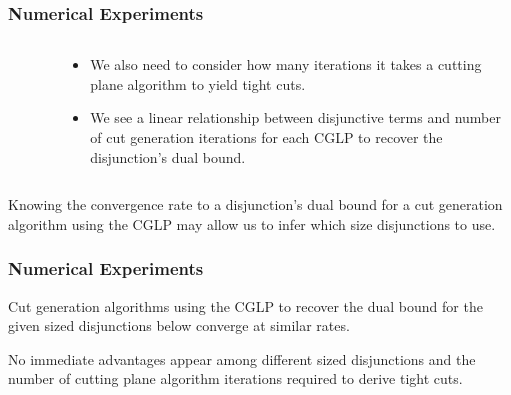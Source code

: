\documentclass{beamer}
\begin{document}
	
	\begin{frame}[t]
		\frametitle{Numerical Experiments}
		\small
		\begin{columns}[T]
			\begin{column}{0.6\textwidth}
				\vspace{-.25cm}
				\begin{figure}[h]
					\label{p:iterations_to_recover}
				\end{figure}
			\end{column}
			\begin{column}{0.4\textwidth}
				\begin{itemize}
					\item We also need to consider how many iterations it takes a cutting plane algorithm to yield tight cuts.
					\item We see a linear relationship between disjunctive terms and number of cut generation iterations for each CGLP to recover the disjunction's dual bound.
				\end{itemize}
			\end{column}
		\end{columns}
		\vspace{.25cm}
		\begin{block}{}
			Knowing the convergence rate to a disjunction's dual bound for a cut generation algorithm using the CGLP may allow us to infer which size disjunctions to use.
		\end{block}
		\normalsize
	\end{frame}
	
	\begin{frame}[t]
		\frametitle{Numerical Experiments}
		\footnotesize
		\vspace{-.35cm}
		Cut generation algorithms using the CGLP to recover the dual bound for the given sized disjunctions below converge at similar rates.
		\vspace{-.1cm}
		\begin{figure}[h]
			\label{p:convergence}
		\end{figure}
		\vspace{-.25cm}
		\begin{block}{}
			No immediate advantages appear among different sized disjunctions and the number of cutting plane algorithm iterations required to derive tight cuts.
		\end{block}
		\normalsize
	\end{frame}
\end{document}
